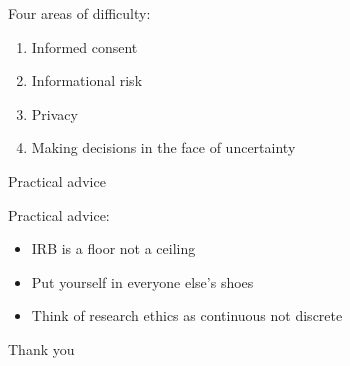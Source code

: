 \documentclass{beamer}
\begin{document}
\begin{frame}

Four areas of difficulty:
\begin{enumerate}
\item Informed consent
\item Informational risk
\item Privacy
\item Making decisions in the face of uncertainty
\end{enumerate}

\end{frame}
\begin{frame}

\begin{center}
\Large{Practical advice}
\end{center}

\end{frame}
\begin{frame}

Practical advice:
\begin{itemize}
\item IRB is a floor not a ceiling
\pause
\item Put yourself in everyone else's shoes
\pause
\item Think of research ethics as continuous not discrete
\end{itemize}

\end{frame}
\begin{frame}

\begin{center}
\LARGE
Thank you
\end{center}

\end{frame}
\end{document}

